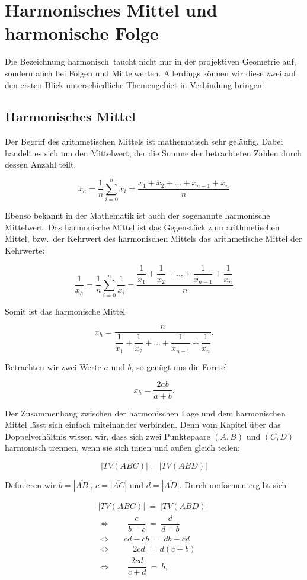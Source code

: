 \documentclass[12pt,a4paper]{article}
\begin{document}
\newpage
\section{Harmonisches Mittel und harmonische Folge}
\label{sec:harmMittel}

Die Bezeichnung \glqq harmonisch\grqq ~taucht nicht nur in der projektiven Geometrie auf, sondern auch bei Folgen und Mittelwerten. Allerdings können wir diese zwei auf den ersten Blick unterschiedliche Themengebiet in Verbindung bringen:

\subsection{Harmonisches Mittel}

Der Begriff des arithmetischen Mittels ist mathematisch sehr geläufig. Dabei handelt es sich um den Mittelwert, der die Summe der betrachteten Zahlen durch dessen Anzahl teilt.

\[x_a = \dfrac{1}{n} \sum_{i=0}^n x_i = \dfrac{x_1 + x_2 + \dots + x_{n-1} + x_n}{n}\]

Ebenso bekannt in der Mathematik ist auch der sogenannte harmonische Mittelwert. Das harmonische Mittel ist das Gegenstück zum arithmetischen Mittel, bzw.~der Kehrwert des harmonischen Mittels das arithmetische Mittel der Kehrwerte:

\[ \dfrac{1}{x_h} = \dfrac{1}{n} \sum_{i=0}^n \dfrac{1}{x_i} = \dfrac{\dfrac{1}{x_1} + \dfrac{1}{x_2} + \dots + \dfrac{1}{x_{n-1}} + \dfrac{1}{x_n}}{n}\]

Somit ist das harmonische Mittel

\[ x_h = \dfrac{n}{\dfrac{1}{x_1} + \dfrac{1}{x_2} + \dots + \dfrac{1}{x_{n-1}} + \dfrac{1}{x_n}}.\]

Betrachten wir zwei Werte $a$ und $b$, so genügt uns die Formel

\[ x_h = \dfrac{2ab}{a+b}.\]

Der Zusammenhang zwischen der harmonischen Lage und dem harmonischen Mittel lässt sich einfach miteinander verbinden. Denn vom Kapitel über das Doppelverhältnis wissen wir, dass sich zwei Punktepaare $(A, B)$ und $(C, D)$ harmonisch trennen, wenn sie sich innen und außen gleich teilen:

\[|TV(A B C)| = |TV(A B D)|\]

Definieren wir $b = |\overline{A B}|$, $c = |\overline{A C}|$ und $d = |\overline{A D}|$. Durch umformen ergibt sich

\begin{equation*}
\begin{split}
|TV(A B C)|~=~|TV(A B D)| ~\\
\Longleftrightarrow ~~~~~~~~~\dfrac{c}{b-c}~=~\dfrac{d}{d-b}~~~~~~~~~~\\
\Longleftrightarrow ~~~~~~~cd-cb~=~db-cd~~~~~~~~\\
\Longleftrightarrow ~~~~~~~~~~~~2 cd~=~d (c+b)~~~~~~~\\
\Longleftrightarrow ~~~~~~~~~\dfrac{2cd}{c+d}~=~b,~~~~~~~~~~~~~~~\\
\end{split}
\end{equation*}
\end{document}
